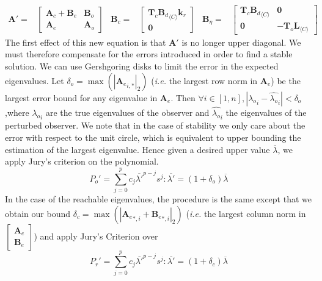 \documentclass[sigconf]{llncs}
\newcommand{\mat}[1]{\boldsymbol{#1}}
\begin{document}
{\setlength{\abovedisplayskip}{0pt}
\begin{align*}
\mat{A}'=&\left [\begin{array}{cc}\mat{A}_{c}+\mat{B}_{e}&\mat{B}_{o}\\ \mat{A}_{e}&\mat{A}_{o}\end{array}\right]&
\mat{B}_{c}=&\left[\begin{array}{c}\mat{T}_c{\mat{B}_d}_{\langle C \rangle}\mat{k}_r\\\mat{0}\end{array}\right]&
\mat{B}_{\eta}=&\left[\begin{array}{cc}\mat{T}_c{\mat{B}_d}_{\langle C \rangle}&\mat{0}\\\mat{0}&-\mat{T}_o\mat{L}_{\langle C \rangle}\end{array}\right]
\end{align*}
}
The first effect of this new equation is that $\mat{A}'$ is no longer upper
diagonal.  We must therefore compensate for the errors introduced in order
to find a stable solution.  We can use Gershgoring disks to limit the error
in the expected eigenvalues.  Let $\delta_o=\max(|{\mat{A}_e}_{i,*}|_2)$
(\emph{i.e.} the largest row norm in $\mat{A}_e$) be the largest error bound
for any eigenvalue in $\mat{A}_e$.  Then $\forall i \in [1, n],
|{\lambda_o}_{i}-\hat{\lambda_o}_{i}|<\delta_o$,where ${\lambda_o}_{i}$ are the
true eigenvalues of the observer and $\hat{\lambda_o}_{i}$ the eigenvalues of
the perturbed observer.  We note that in the case of stability we only care
about the error with respect to the unit circle, which is equivalent to
upper bounding the estimation of the largest eigenvalue.  Hence given a
desired upper value $\overline{\lambda}$, we apply Jury's criterion on the
polynomial.
%
\begin{equation}
P_o'=\sum_{j=0}^p c_j\overline{\lambda'}^{p-j}s^j : \overline{\lambda'}=(1+\delta_o)\overline{\lambda}
\end{equation}
%
In the case of the reachable eigenvalues, the procedure is the same except
that we obtain our bound $\delta_c=\max(|{\mat{A}_e}_{*,i}+{\mat{B}_e}_{*,i}|_2)$
(\emph{i.e.} the largest column norm in $ \left[\begin{array}{c}\mat{A}_e\\ \mat{B}_e\end{array}\right]$) and
apply Jury's Criterion over
%
\begin{equation}
P_r'=\sum_{j=0}^p c_j\overline{\lambda'}^{p-j}s^j : \overline{\lambda'}=(1+\delta_c)\overline{\lambda}
\end{equation}
\end{document}
